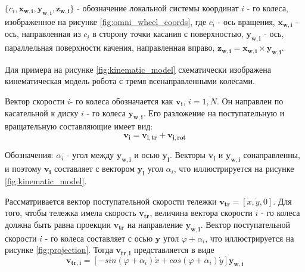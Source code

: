\documentclass[oneside,final,14pt]{extreport}
\newcommand{\bs}{\boldsymbol}
\begin{document}
$\{c_{i},\bs{x_{w,i}},\bs{y_{w,i}},\bs{z_{w,i}}\}$ - обозначение локальной системы координат $i$ - го колеса, изображенное на рисунке \ref{fig:omni_wheel_coords}, где $c_{i}$ - ось вращения, $\bs{x_{w,i}}$  - ось, направленная из $c_{i}$  в сторону точки касания с поверхностью, $\bs{y_{w,i}}$ - ось, параллельная поверхности качения, направленная вправо, $\bs{z_{w,i}} = \bs{x_{w,i}} \times \bs{y_{w,i}}$.  

Для примера на рисунке \ref{fig:kinematic_model} схематически изображена кинематическая модель робота с тремя всенаправленными колесами.


\begin{figure}[H]
\end{figure}

\begin{figure}[H]
\end{figure}

Вектор скорости $i$- го колеса обозначается как  $\bs{v_{i}}$, $i = \overline{1,N}$. Он направлен по касательной к диску $i$ - го колеса $\bs{y_{w,i}}$. Его разложение на поступательную и  вращательную составляющие имеет вид:
\begin{equation}
\bs{v_{i}}
=
\bs{v_{i,tr}}
+
\bs{v_{i,rot}}
\end{equation}

Обозначения: $\alpha_{i}$ - угол между $\bs{y_{w,i}}$ и осью $\bs{y_{l}}$. Векторы $\bs{v_{i}}$ и $\bs{y_{w,i}}$ сонаправленны, и поэтому $\bs{v_{i}}$ составляет с вектором  $\bs{y_{l}}$ угол $\alpha_{i}$, что иллюстрируется на рисунке \ref{fig:kinematic_model}.



Рассматривается вектор поступательной скорости тележки $\bs{v_{tr}}=[\dot{x},\dot{y},0]$. Для того, чтобы тележка имела скорость $\bs{v_{tr}}$, величина вектора скорости $i$ - го колеса должна быть равна проекции $\bs{v_{tr}}$ на направление $\bs{y_{w,i}}$. Вектор поступательной скорости $i$ - го колеса составляет с осью $\bs{y}$  угол $\varphi + \alpha_{i}$, что иллюстрируется на рисунке \ref{fig:projection}. Тогда $\bs{v_{tr,i}}$ представляется в виде
\begin{equation}
\label{eq:v_rt_i_global}
\bs{v_{tr,i}} 
=
[
-sin(\varphi +\alpha_{i})
\dot{x}
+
cos(\varphi +\alpha_{i})
\dot{y}
]
\bs{y_{w,i}}
\end{equation} 
\end{document}

